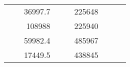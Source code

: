 \begin{table}[H]
\begin{tabular}{|ccrccrccc}
\multicolumn{1}{|c|}{\cellcolor[HTML]{FFFFC7}}                                & \multicolumn{1}{c|}{\cellcolor[HTML]{DAE8FC}}                      & \multicolumn{1}{r|}{\cellcolor[HTML]{DAE8FC}36997.7}   & \multicolumn{1}{c|}{\cellcolor[HTML]{FFFFC7}}                                & \multicolumn{1}{c|}{\cellcolor[HTML]{DAE8FC}}                       & \multicolumn{1}{r|}{\cellcolor[HTML]{DDFDFF}225648}    &                                                                              &                                                                    &                                                        \\ \cline{3-3} \cline{6-6}
\multicolumn{1}{|c|}{\cellcolor[HTML]{FFFFC7}}                                & \multicolumn{1}{c|}{\cellcolor[HTML]{DAE8FC}}                      & \multicolumn{1}{r|}{\cellcolor[HTML]{DDFDFF}108988}    & \multicolumn{1}{c|}{\cellcolor[HTML]{FFFFC7}}                                & \multicolumn{1}{c|}{\cellcolor[HTML]{DAE8FC}}                       & \multicolumn{1}{r|}{\cellcolor[HTML]{DAE8FC}225940}    &                                                                              &                                                                    &                                                        \\ \cline{3-3} \cline{6-6}
\multicolumn{1}{|c|}{\cellcolor[HTML]{FFFFC7}}                                & \multicolumn{1}{c|}{\cellcolor[HTML]{DAE8FC}}                      & \multicolumn{1}{r|}{\cellcolor[HTML]{DAE8FC}59982.4}   & \multicolumn{1}{c|}{\cellcolor[HTML]{FFFFC7}}                                & \multicolumn{1}{c|}{\cellcolor[HTML]{DAE8FC}}                       & \multicolumn{1}{r|}{\cellcolor[HTML]{DDFDFF}485967}    &                                                                              &                                                                    &                                                        \\ \cline{3-3} \cline{6-6}
\multicolumn{1}{|c|}{\cellcolor[HTML]{FFFFC7}}                                & \multicolumn{1}{c|}{\cellcolor[HTML]{DAE8FC}}                      & \multicolumn{1}{r|}{\cellcolor[HTML]{DDFDFF}17449.5}   & \multicolumn{1}{c|}{\cellcolor[HTML]{FFFFC7}}                                & \multicolumn{1}{c|}{\cellcolor[HTML]{DAE8FC}}                       & \multicolumn{1}{r|}{\cellcolor[HTML]{DAE8FC}438845}    &                                                                              &                                                                    &                                                        \\ \cline{3-3} \cline{6-6}

\end{tabular}
\end{table}
